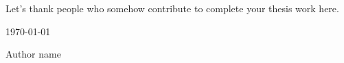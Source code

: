 ﻿Let's thank people who somehow contribute to complete your thesis work here.

\begin{flushright}
\par
\noindent
\today

\par
\noindent
Author name
\end{flushright}
